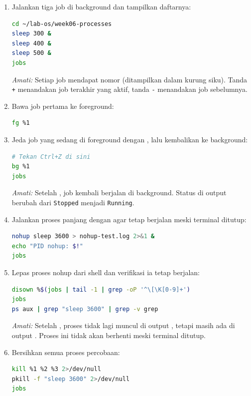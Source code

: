 \begin{enumerate}
    \item Jalankan tiga job di background dan tampilkan daftarnya:
\begin{lstlisting}[language=bash, caption={Menjalankan tiga job di background}]
cd ~/lab-os/week06-processes
sleep 300 &
sleep 400 &
sleep 500 &
jobs
\end{lstlisting}
    \textit{Amati:} Setiap job mendapat nomor (ditampilkan dalam kurung siku). Tanda \texttt{+} menandakan job terakhir yang aktif, tanda \texttt{-} menandakan job sebelumnya.

    \item Bawa job pertama ke foreground:
\begin{lstlisting}[language=bash, caption={Membawa job ke foreground}]
fg %1
\end{lstlisting}

    \item Jeda job yang sedang di foreground dengan , lalu kembalikan ke background:
\begin{lstlisting}[language=bash]
# Tekan Ctrl+Z di sini
bg %1
jobs
\end{lstlisting}
    \textit{Amati:} Setelah , job kembali berjalan di background. Status di output  berubah dari \texttt{Stopped} menjadi \texttt{Running}.

    \item Jalankan proses panjang dengan  agar tetap berjalan meski terminal ditutup:
\begin{lstlisting}[language=bash, caption={Menjalankan proses tahan logout}]
nohup sleep 3600 > nohup-test.log 2>&1 &
echo "PID nohup: $!"
jobs
\end{lstlisting}

    \item Lepas proses nohup dari shell dan verifikasi ia tetap berjalan:
\begin{lstlisting}[language=bash, caption={Melepas proses dari shell dengan disown}]
disown %$(jobs | tail -1 | grep -oP '^\[\K[0-9]+')
jobs
ps aux | grep "sleep 3600" | grep -v grep
\end{lstlisting}
    \textit{Amati:} Setelah , proses tidak lagi muncul di output , tetapi masih ada di output . Proses ini tidak akan berhenti meski terminal ditutup.

    \item Bersihkan semua proses percobaan:
\begin{lstlisting}[language=bash, caption={Membersihkan semua proses percobaan}]
kill %1 %2 %3 2>/dev/null
pkill -f "sleep 3600" 2>/dev/null
jobs
\end{lstlisting}
\end{enumerate}

